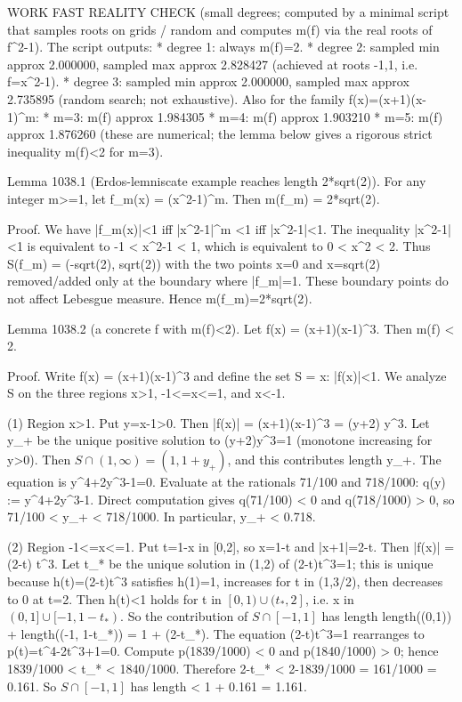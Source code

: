 WORK
FAST REALITY CHECK (small degrees; computed by a minimal script that samples roots on grids / random and computes m(f) via the real roots of f^2-1).
The script outputs:
* degree 1: always m(f)=2.
* degree 2: sampled min approx 2.000000, sampled max approx 2.828427 (achieved at roots -1,1, i.e. f=x^2-1).
* degree 3: sampled min approx 2.000000, sampled max approx 2.735895 (random search; not exhaustive).
Also for the family f(x)=(x+1)(x-1)^m:
* m=3: m(f) approx 1.984305
* m=4: m(f) approx 1.903210
* m=5: m(f) approx 1.876260
(these are numerical; the lemma below gives a rigorous strict inequality m(f)<2 for m=3).

Lemma 1038.1 (Erdos-lemniscate example reaches length 2*sqrt(2)).
For any integer m>=1, let f_m(x) = (x^2-1)^m. Then
  m(f_m) = 2*sqrt(2).

Proof.
We have |f_m(x)|<1 iff |x^2-1|^m <1 iff |x^2-1|<1. The inequality |x^2-1|<1 is equivalent to
  -1 < x^2-1 < 1,
which is equivalent to
  0 < x^2 < 2.
Thus S(f_m) = (-sqrt(2), sqrt(2)) with the two points x=0 and x=\pm sqrt(2) removed/added only at the boundary where |f_m|=1. These boundary points do not affect Lebesgue measure. Hence m(f_m)=2*sqrt(2).

Lemma 1038.2 (a concrete f with m(f)<2).
Let f(x) = (x+1)(x-1)^3. Then m(f) < 2.

Proof.
Write f(x) = (x+1)(x-1)^3 and define the set S = {x: |f(x)|<1}.
We analyze S on the three regions x>1, -1<=x<=1, and x<-1.

(1) Region x>1.  Put y=x-1>0. Then
  |f(x)| = (x+1)(x-1)^3 = (y+2) y^3.
Let y_+ be the unique positive solution to (y+2)y^3=1 (monotone increasing for y>0). Then \(S\cap(1,\infty) = (1, 1+y_+)\), and this contributes length y_+.
The equation is y^4+2y^3-1=0. Evaluate at the rationals 71/100 and 718/1000:
  q(y) := y^4+2y^3-1.
Direct computation gives q(71/100) < 0 and q(718/1000) > 0, so 71/100 < y_+ < 718/1000.
In particular, y_+ < 0.718.

(2) Region -1<=x<=1.  Put t=1-x in [0,2], so x=1-t and |x+1|=2-t. Then
  |f(x)| = (2-t) t^3.
Let t_* be the unique solution in (1,2) of (2-t)t^3=1; this is unique because h(t)=(2-t)t^3 satisfies h(1)=1, increases for t in (1,3/2), then decreases to 0 at t=2.
Then h(t)<1 holds for t in \([0,1) \cup (t_*,2]\), i.e. x in \((0,1] \cup [-1, 1-t_*)\).
So the contribution of \(S\cap[-1,1]\) has length
  length((0,1)) + length((-1, 1-t_*)) = 1 + (2-t_*).
The equation (2-t)t^3=1 rearranges to p(t)=t^4-2t^3+1=0. Compute p(1839/1000) < 0 and p(1840/1000) > 0; hence 1839/1000 < t_* < 1840/1000.
Therefore 2-t_* < 2-1839/1000 = 161/1000 = 0.161.
So \(S\cap[-1,1]\) has length < 1 + 0.161 = 1.161.

